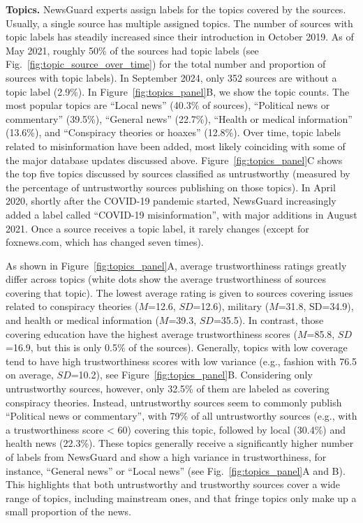 \documentclass[12pt,twoside]{article}
\begin{document}
\textbf{Topics.} 
NewsGuard experts assign labels for the topics covered by the sources. 
Usually, a single source has multiple assigned topics. 
The number of sources with topic labels has steadily increased since their introduction in October 2019.  
As of May 2021, roughly 50\% of the sources had topic labels (see Fig.~\ref{fig:topic_source_over_time}) for the total number and proportion of sources with topic labels). 
In September 2024, only 352 sources are without a topic label (2.9\%). 
In Figure~\ref{fig:topics_panel}B, we show the topic counts. 
The most popular topics are ``Local news'' (40.3\% of sources), ``Political news or commentary'' (39.5\%), ``General news'' (22.7\%), ``Health or medical information'' (13.6\%), and ``Conspiracy theories or hoaxes'' (12.8\%). 
Over time, topic labels related to misinformation have been added, most likely coinciding with some of the major database updates discussed above. 
Figure~\ref{fig:topics_panel}C shows the top five topics discussed by sources classified as untrustworthy (measured by the percentage of untrustworthy sources publishing on those topics).
In April 2020, shortly after the COVID-19 pandemic started, NewsGuard increasingly added a label called ``COVID-19 misinformation'', with major additions in August 2021.
Once a source receives a topic label, it rarely changes (except for foxnews.com, which has changed seven times).


As shown in Figure~\ref{fig:topics_panel}A, average trustworthiness ratings greatly differ across topics (white dots show the average trustworthiness of sources covering that topic). 
The lowest average rating is given to sources covering issues related to conspiracy theories ($M$=12.6, $SD$=12.6), military ($M$=31.8, SD=34.9), and health or medical information ($M$=39.3, $SD$=35.5).
In contrast, those covering education have the highest average trustworthiness scores ($M$=85.8, $SD$=16.9, but this is only 0.5\% of the sources).
Generally, topics with low coverage tend to have high trustworthiness scores with low variance (e.g., fashion with 76.5 on average, $SD$=10.2), see Figure~\ref{fig:topics_panel}B.
Considering only untrustworthy sources, however, only 32.5\% of them are labeled as covering conspiracy theories. 
Instead, untrustworthy sources seem to commonly publish ``Political news or commentary'', with 79\% of all untrustworthy sources (e.g., with a trustworthiness score < 60) covering this topic, followed by local (30.4\%) and health news (22.3\%). 
These topics generally receive a significantly higher number of labels from NewsGuard and show a high variance in trustworthiness, for instance, ``General news'' or ``Local news'' (see Fig.~\ref{fig:topics_panel}A and B).
This highlights that both untrustworthy and trustworthy sources cover a wide range of topics, including mainstream ones, and that fringe topics only make up a small proportion of the news.
\end{document}
